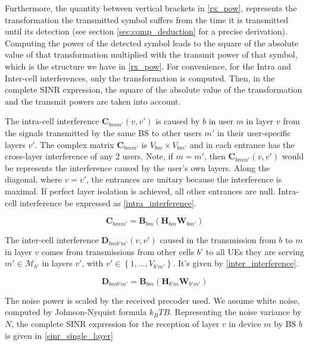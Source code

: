 Furthermore, the quantity between vertical brackets in \eqref{rx_pow}, represents the transformation the transmitted symbol suffers from the time it is transmitted until its detection (see section \ref{sec:comp_deduction} for a precise derivation). Computing the power of the detected symbol leads to the square of the absolute value of that transformation multiplied with the transmit power of that symbol, which is the structure we have in \eqref{rx_pow}. For convenience, for the Intra and Inter-cell interferences, only the transformation is computed. Then, in the complete \acs{SINR} expression, the square of the absolute value of the transformation and the transmit powers are taken into account.

The intra-cell interference $\bm{C}_{bmm'}(v,v')$ is caused by $b$ in user $m$ in layer $v$ from the signals transmitted by the same \acs{BS} to other users $m'$ in their user-specific layers $v'$. The complex matrix $\bm{C}_{bmm'}$ is $V_{bm} \times V_{bm'}$ and in each entrance has the cross-layer interference of any 2 users. Note, if $m = m'$, then $\bm{C}_{bmm'}(v,v')$ would be represents the interference caused by the user's own layers. Along the diagonal, where $v = v'$, the entrances are unitary because the interference is maximal. If perfect layer isolation is achieved, all other entrances are null. Intra-cell interference be expressed as \eqref{intra_interference}.

\begin{equation} \label{intra_interference}
    \bm{C}_{bmm'} = \bm{B}_{bm} \left( \bm{H}_{bm} \bm{W}_{bm'} \right) 
\end{equation}

The inter-cell interference $\bm{D}_{bmb'm'}(v,v')$ caused in the transmission from $b$ to $m$ in layer $v$ comes from transmissions from other cells $b'$ to all \acsp{UE} they are serving $m' \in \mathcal{M}_{b'}$ in layers $v'$, with $v' \in \left\{1, ..., V_{b'm'} \right\}$. It's given by \eqref{inter_interference}. 

\begin{equation} \label{inter_interference}
    \bm{D}_{bmb'm'} = \bm{B}_{bm} \left( \bm{H}_{b'm} \bm{W}_{b'm'} \right)
\end{equation}


The noise power is scaled by the received precoder used. We assume white noise, computed by Johnson-Nyquist formula \cite{PhysRev.32.110} $k_B T B$. Representing the noise variance by $N$, the complete SINR expression for the reception of layer $v$ in device $m$ by \acs{BS} $b$ is given in \eqref{sinr_single_layer}

